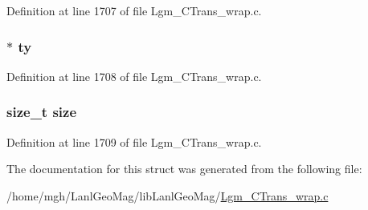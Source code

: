 Definition at line 1707 of file Lgm\_\-CTrans\_\-wrap.c.\hypertarget{struct_py_swig_packed_6b6270e5da3083fb1e9476b22a0611ad}{
\subsubsection[{ty}]{$\ast$ {\bf ty}}}
\label{struct_py_swig_packed_6b6270e5da3083fb1e9476b22a0611ad}




Definition at line 1708 of file Lgm\_\-CTrans\_\-wrap.c.\hypertarget{struct_py_swig_packed_854352f53b148adc24983a58a1866d66}{
\subsubsection[{size}]{\setlength{\rightskip}{0pt plus 5cm}size\_\-t {\bf size}}}
\label{struct_py_swig_packed_854352f53b148adc24983a58a1866d66}




Definition at line 1709 of file Lgm\_\-CTrans\_\-wrap.c.

The documentation for this struct was generated from the following file:\begin{CompactItemize}
\item 
/home/mgh/LanlGeoMag/libLanlGeoMag/\hyperlink{_lgm___c_trans__wrap_8c}{Lgm\_\-CTrans\_\-wrap.c}\end{CompactItemize}
